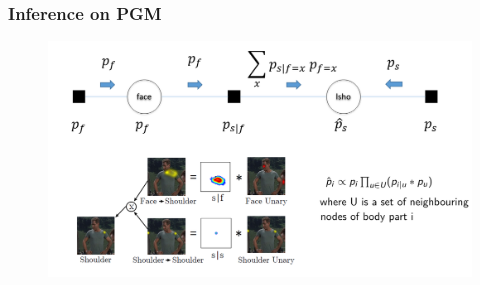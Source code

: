 \documentclass{beamer}
\begin{document}
	\begin{frame}[t]
        \frametitle{Inference on PGM}
        \begin{center}
            \begin{figure}[htbp] %
            \includegraphics[scale=0.32]{inference.png}
            \end{figure}
        \end{center}
    \end{frame}
\end{document}
